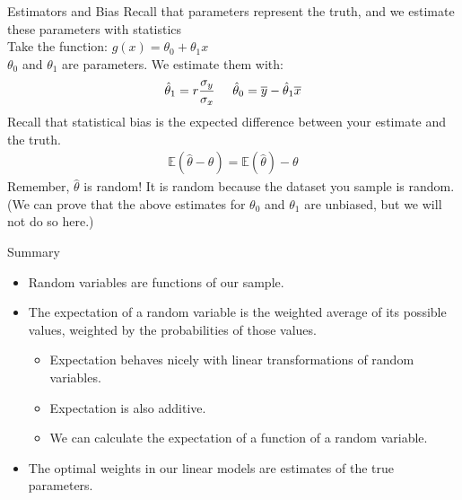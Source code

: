 \documentclass[aspectratio=169]{../latex_main/tntbeamer}  %
\begin{document}
	
	\begin{frame}[c]{Estimators and Bias}
	    Recall that parameters represent the truth, and we estimate these parameters with statistics\\
	    Take the function: $g(x) = \theta_0 + \theta_1x$\\
	   $\theta_0$ and $\theta_1$ are parameters. We estimate them with:
	    \begin{align*}
	       \hat{\theta}_1 = r\frac{\sigma_y}{\sigma_x}\hspace{5mm} \hat{\theta}_0 = \overline{y} - \hat{\theta}_1\overline{x}
	    \end{align*}
	    Recall that statistical bias is the expected difference between your estimate and the truth.
        \begin{align*}
            \mathbb{E}(\hat{\theta} - \theta) = \mathbb{E}(\hat{\theta}) - \theta
        \end{align*}
        Remember, $\hat{\theta}$	is random! It is random because the dataset you sample is random.\\
        (We can prove that the above estimates for $\theta_0$ and $\theta_1$ are unbiased, but we will not do so here.)

	\end{frame}
	
	
	\begin{frame}[c]{Summary}
	   \begin{itemize}
	       \item Random variables are functions of our sample.
	       \item The expectation of a random variable is the weighted average of its possible values, weighted by the probabilities of those values.
	       \begin{itemize}
	           \item Expectation behaves nicely with linear transformations of random variables.
	           \item Expectation is also additive.
	           \item We can calculate the expectation of a function of a random variable.
	       \end{itemize}
	       \item The optimal weights in our linear models are estimates of the true parameters.
	   \end{itemize}
	\end{frame}
\end{document}

